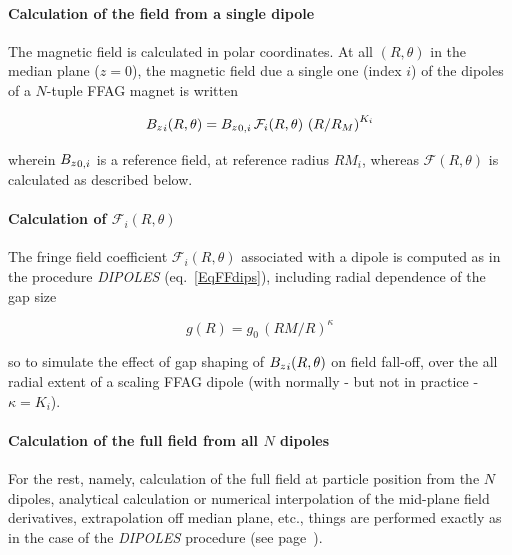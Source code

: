 \bigskip


\paragraph{Calculation of the field from a single dipole} 

 \noindent The magnetic field is calculated in  polar
coordinates.  At all $(R,\theta)$ in the median plane ($z=0$), the 
magnetic field  due  a single one (index $i$) of the  dipoles  of a $N$-tuple FFAG  magnet is written 

$$ {B_z}_i(R,\theta) =  {B_z}_{0,i} \, \mathcal{F}_i(R,\theta) \, \left(   R/R_M \right)^{K_i}  $$

\noindent wherein ${B_z}_{0,i}$  is a reference field, at reference radius  $RM_{i}$, 
 whereas $ \mathcal{F}(R,\theta)$ is calculated as described below. 



\paragraph{Calculation of $\mathcal{F}_i(R,\theta) $} 

\noindent The fringe field coefficient  $\mathcal{F}_i(R,\theta) $ associated with a  dipole is computed as in the 
procedure  \textsl{DIPOLES} (eq.~\ref{EqFFdips}), including  radial dependence of the gap size 

\begin{equation}
g(R) = g_0 \, (RM/R)^{\kappa}
\end{equation}

\noindent  so to simulate the effect of gap shaping of $ {B_z}_i(R,\theta)$ on 
field fall-off,  over the 
all radial extent of a scaling FFAG dipole (with normally - but not in practice - $\kappa = K_i$). 
 

\bigskip

\paragraph{Calculation of the full field from all $N$ dipoles}

For the rest, namely, calculation of the full field at particle position from the $N$ dipoles,  
analytical   calculation or numerical interpolation of the  mid-plane field derivatives, 
extrapolation off median plane, etc., things are performed exactly as in the case of the 
 \textsl{DIPOLES} procedure (see page~\pageref{FFatAP}). 





